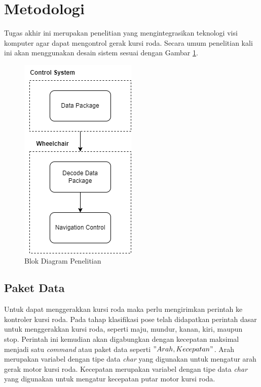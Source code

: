 \section{Metodologi}
\label{sec:metodologi}


Tugas akhir ini merupakan penelitian yang mengintegrasikan teknologi visi komputer agar dapat mengontrol gerak kursi roda. Secara umum penelitian kali ini akan menggunakan desain sistem sesuai dengan Gambar \ref{fig:Metodologi Penelitian}.

\begin{figure} [ht] \centering
    \includegraphics[scale=0.8]{gambar/block diagram.png}
    \caption{Blok Diagram Penelitian}
    \label{fig:Metodologi Penelitian}
\end{figure}

\subsection{Paket Data}
Untuk dapat menggerakkan kursi roda maka perlu mengirimkan perintah ke kontroler kursi roda. Pada tahap klasifikasi pose telah didapatkan perintah dasar untuk menggerakkan kursi roda, seperti maju, mundur, kanan, kiri, maupun stop. Perintah ini kemudian akan digabungkan dengan kecepatan maksimal menjadi satu \emph{command} atau paket data seperti \("Arah, Kecepatan"\). Arah merupakan variabel dengan tipe data \emph{char} yang digunakan untuk mengatur arah gerak motor kursi roda. Kecepatan merupakan variabel dengan tipe data \emph{char} yang digunakan untuk mengatur kecepatan putar motor kursi roda.


